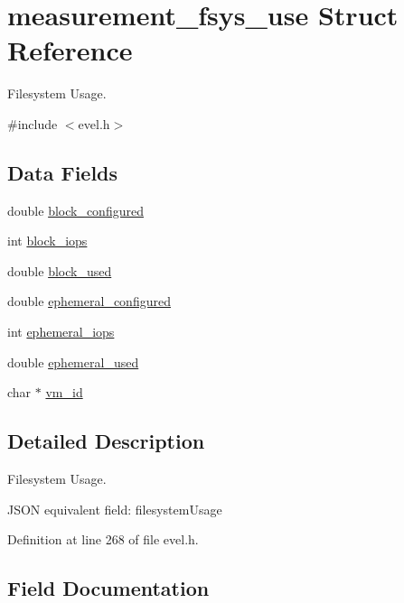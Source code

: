 \hypertarget{structmeasurement__fsys__use}{}\section{measurement\+\_\+fsys\+\_\+use Struct Reference}
\label{structmeasurement__fsys__use}


Filesystem Usage.  




{\ttfamily \#include $<$evel.\+h$>$}

\subsection*{Data Fields}
\begin{DoxyCompactItemize}
\item 
double \hyperlink{structmeasurement__fsys__use_af56164f34467ba0112a396955042fa1c}{block\+\_\+configured}
\item 
int \hyperlink{structmeasurement__fsys__use_ab41ba374abdbd41b71a029e4be061a24}{block\+\_\+iops}
\item 
double \hyperlink{structmeasurement__fsys__use_ad156e14eb4f7f3ab929e4b709aa1ebea}{block\+\_\+used}
\item 
double \hyperlink{structmeasurement__fsys__use_a6cc01785b8eb12d616454fb7070ccaa0}{ephemeral\+\_\+configured}
\item 
int \hyperlink{structmeasurement__fsys__use_a7389ea2d9e7a81e449b77eede1a3c691}{ephemeral\+\_\+iops}
\item 
double \hyperlink{structmeasurement__fsys__use_a5b03b9de4fcc06f38446b20a0a1a6530}{ephemeral\+\_\+used}
\item 
char $\ast$ \hyperlink{structmeasurement__fsys__use_a7748b01aae2eba6e018deb88fc9d6726}{vm\+\_\+id}
\end{DoxyCompactItemize}


\subsection{Detailed Description}
Filesystem Usage. 

J\+S\+O\+N equivalent field\+: filesystem\+Usage 

Definition at line 268 of file evel.\+h.



\subsection{Field Documentation}
\hypertarget{structmeasurement__fsys__use_af56164f34467ba0112a396955042fa1c}{}
